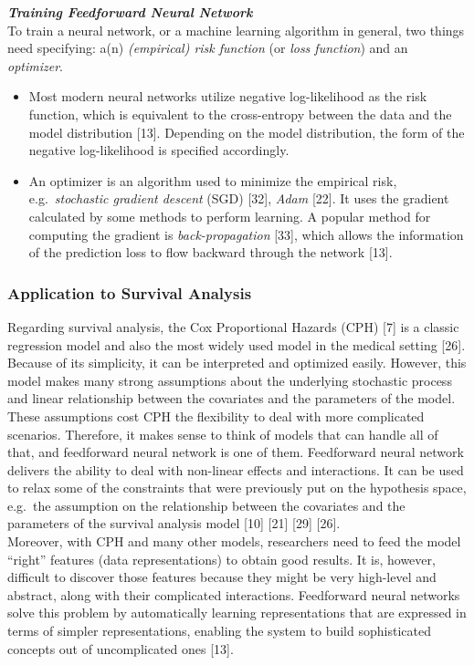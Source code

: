 \documentclass[
]{article}
\providecommand{\tightlist}{%
  \setlength{\itemsep}{0pt}\setlength{\parskip}{0pt}}
\begin{document}
\textbf{\emph{Training Feedforward Neural Network}}\\
To train a neural network, or a machine learning algorithm in general, two things need specifying: a(n) \emph{(empirical) risk function} (or \emph{loss function}) and an \emph{optimizer}.
\vspace{-0.5cm}

\begin{itemize}
\tightlist
\item
  Most modern neural networks utilize negative log-likelihood as the risk function, which is equivalent to the cross-entropy between the data and the model distribution {[}13{]}. Depending on the model distribution, the form of the negative log-likelihood is specified accordingly.
\item
  An optimizer is an algorithm used to minimize the empirical risk, e.g.~\emph{stochastic gradient descent} (SGD) {[}32{]}, \emph{Adam} {[}22{]}. It uses the gradient calculated by some methods to perform learning. A popular method for computing the gradient is \emph{back-propagation} {[}33{]}, which allows the information of the prediction loss to flow backward through the network {[}13{]}.
\end{itemize}

\hypertarget{application-to-survival-analysis}{%
\subsubsection{Application to Survival Analysis}\label{application-to-survival-analysis}}

Regarding survival analysis, the Cox Proportional Hazards (CPH) {[}7{]} is a classic regression model and also the most widely used model in the medical setting {[}26{]}. Because of its simplicity, it can be interpreted and optimized easily. However, this model makes many strong assumptions about the underlying stochastic process and linear relationship between the covariates and the parameters of the model. These assumptions cost CPH the flexibility to deal with more complicated scenarios. Therefore, it makes sense to think of models that can handle all of that, and feedforward neural network is one of them. Feedforward neural network delivers the ability to deal with non-linear effects and interactions. It can be used to relax some of the constraints that were previously put on the hypothesis space, e.g.~the assumption on the relationship between the covariates and the parameters of the survival analysis model {[}10{]} {[}21{]} {[}29{]} {[}26{]}.\\
Moreover, with CPH and many other models, researchers need to feed the model ``right'' features (data representations) to obtain good results. It is, however, difficult to discover those features because they might be very high-level and abstract, along with their complicated interactions. Feedforward neural networks solve this problem by automatically learning representations that are expressed in terms of simpler representations, enabling the system to build sophisticated concepts out of uncomplicated ones {[}13{]}.
\end{document}
